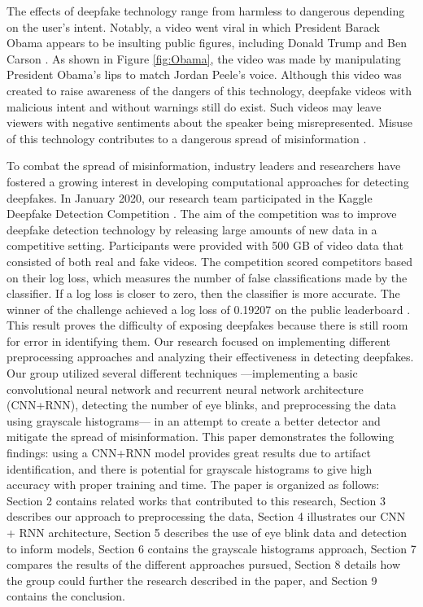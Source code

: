 \documentclass[a4paper]{article}
\begin{document}
\par
The effects of deepfake technology range from harmless to dangerous depending on the user’s intent. Notably, a video went viral in which President Barack Obama appears to be insulting public figures, including Donald Trump and Ben Carson \cite{Obama}. As shown in Figure \ref{fig:Obama}, the video was made by manipulating President Obama's lips to match Jordan Peele's voice. Although this video was created to raise awareness of the dangers of this technology, deepfake videos with malicious intent and without warnings still do exist. Such videos may leave viewers with negative sentiments about the speaker being misrepresented. Misuse of this technology contributes to a dangerous spread of misinformation \cite{danger}.

\par
To combat the spread of misinformation, industry leaders and researchers have fostered a growing interest in developing computational approaches for detecting deepfakes. In January 2020, our research team participated in the Kaggle Deepfake Detection Competition \cite{Comp}. The aim of the competition was to improve deepfake detection technology by releasing large amounts of new data in a competitive setting. Participants were provided with 500 GB of video data that consisted of both real and fake videos. The competition scored competitors based on their log loss, which measures the number of false classifications made by the classifier. If a log loss is closer to zero, then the classifier is more accurate. The winner of the challenge achieved a log loss of 0.19207 on the public leaderboard \cite{CompRes}. This result proves the difficulty of exposing deepfakes because there is still room for error in identifying them. Our research focused on implementing different preprocessing approaches and analyzing their effectiveness in detecting deepfakes. Our group utilized several different techniques —implementing a basic convolutional neural network and recurrent neural network architecture (CNN+RNN), detecting the number of eye blinks, and preprocessing the data using grayscale histograms— in an attempt to create a better detector and mitigate the spread of misinformation. This paper demonstrates the following findings: using a CNN+RNN model provides great results due to artifact identification, and there is potential for grayscale histograms to give high accuracy with proper training and time. The paper is organized as follows: Section 2 contains related works that contributed to this research, Section 3 describes our approach to preprocessing the data, Section 4 illustrates our CNN + RNN architecture, Section 5 describes the use of eye blink data and detection to inform models, Section 6 contains the grayscale histograms approach, Section 7 compares the results of the different approaches pursued, Section 8 details how the group could further the research described in the paper, and Section 9 contains the conclusion.
\end{document}
